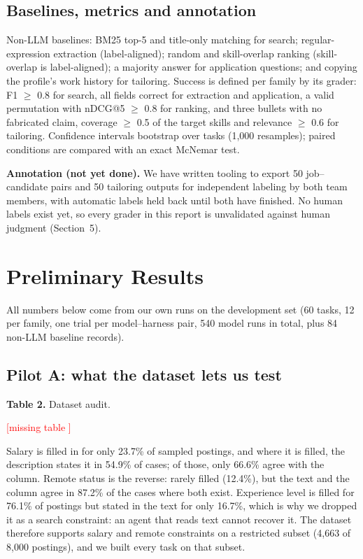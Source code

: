 \documentclass[11pt]{article}
\newcommand{\fillin}[1]{\textcolor{red}{[#1]}}
\newcommand{\resulttable}[1]{%
  \IfFileExists{tables/#1.tex}%
    {}%
    {\fillin{missing table \detokenize{#1}}}}
\begin{document}
\subsection{Baselines, metrics and annotation}
Non-LLM baselines: BM25 top-5 and title-only matching for search; regular-expression extraction (label-aligned); random and skill-overlap ranking (skill-overlap is label-aligned); a majority answer for application questions; and copying the profile's work history for tailoring. Success is defined per family by its grader: F1 $\geq$ 0.8 for search, all fields correct for extraction and application, a valid permutation with nDCG@5 $\geq$ 0.8 for ranking, and three bullets with no fabricated claim, coverage $\geq$ 0.5 of the target skills and relevance $\geq$ 0.6 for tailoring. Confidence intervals bootstrap over tasks (1,000 resamples); paired conditions are compared with an exact McNemar test.

\textbf{Annotation (not yet done).} We have written tooling to export 50 job--candidate pairs and 50 tailoring outputs for independent labeling by both team members, with automatic labels held back until both have finished. No human labels exist yet, so every grader in this report is unvalidated against human judgment (Section~5).

\section{Preliminary Results}

All numbers below come from our own runs on the development set (60 tasks, 12 per family, one trial per model--harness pair, 540 model runs in total, plus 84 non-LLM baseline records).

\subsection{Pilot A: what the dataset lets us test}
\textbf{Table 2.} Dataset audit.\par
\resulttable{audit}

Salary is filled in for only 23.7\% of sampled postings, and where it is filled, the description states it in 54.9\% of cases; of those, only 66.6\% agree with the column. Remote status is the reverse: rarely filled (12.4\%), but the text and the column agree in 87.2\% of the cases where both exist. Experience level is filled for 76.1\% of postings but stated in the text for only 16.7\%, which is why we dropped it as a search constraint: an agent that reads text cannot recover it. The dataset therefore supports salary and remote constraints on a restricted subset (4,663 of 8,000 postings), and we built every task on that subset.
\end{document}
